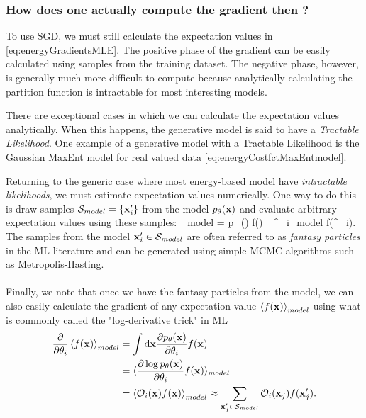 \subsubsection{How does one actually compute the gradient then ?}
To use SGD, we must still calculate the expectation values in \ref{eq:energyGradientsMLE}. The positive phase of the gradient can be easily calculated using samples from the training dataset. The negative phase, however, is generally much more difficult to compute because analytically calculating the partition function is intractable for most interesting models.
\begin{definition}
	There are exceptional cases in which we can calculate the expectation values analytically. When this happens, the generative model is said to have a \emph{Tractable Likelihood}. One example of a generative model with a Tractable Likelihood is the Gaussian MaxEnt model for real valued data \ref{eq:energyCostfctMaxEntmodel}.
\end{definition}
Returning to the generic case where most energy-based model have \emph{intractable likelihoods}, we must estimate expectation values numerically. One way to do this is draw samples $\mathcal{S}_{model} =\{\mathbf{x}^\prime_i\}$ from the model $p_{\theta}(\mathbf{x})$ and evaluate arbitrary expectation values using these samples:
\be 
{}_{model} = \int \md \mx p_\theta(\mx) f(\mx) \approx \sum_{\mx^\prime_i\in{}_{model}} f(\mx^\prime_i).
\ee 
The samples from the model $\mathbf{x}^\prime_i\in\mathcal{S}_{model}$ are often referred to as \emph{fantasy particles} in the ML literature and can be generated using simple MCMC algorithms such as Metropolis-Hasting.\\
\\
Finally, we note that once we have the fantasy particles from the model, we can also easily calculate the gradient of any expectation value $\expval{f(\mathbf{x})}_{model}$ using what is commonly called the "log-derivative trick" in ML
\begin{align*}
	\frac{\partial}{\partial \theta_i} \expval{f(\mathbf{x})}_{model} &= \int \mathrm{d} \mathbf{x} \frac{\partial p_\theta(\mathbf{x})}{\partial \theta_i} f(\mathbf{x}) \\
	&= \langle \frac{\partial \log p_\theta(\mathbf{x})}{\partial \theta_i} f(\mathbf{x})\rangle _{model} \\
&= \expval{\mathcal{O}_i(\mathbf{x}) f(\mathbf{x})}_{model} \approx \sum_{\mathbf{x}^\prime_j\in\mathcal{S}_{model}} \mathcal{O}_i(\mathbf{x}_j) f(\mathbf{x}^\prime_j).
\end{align*}




